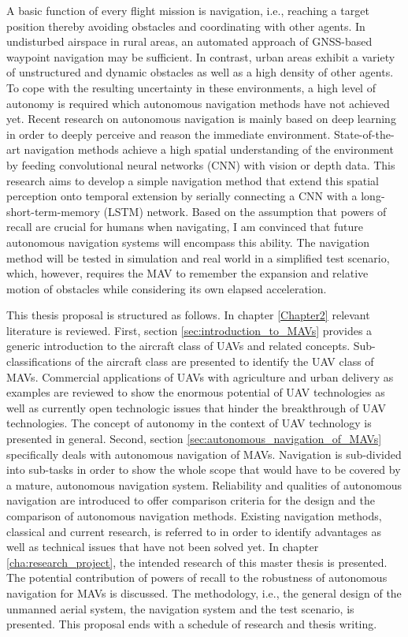A basic function of every flight mission is navigation, i.e.,
reaching a target position thereby avoiding obstacles and coordinating with other agents.
In undisturbed airspace in rural areas, an automated approach of GNSS-based waypoint navigation may be sufficient.
In contrast, urban areas exhibit a variety of unstructured and dynamic obstacles
as well as a high density of other agents. 
To cope with the resulting uncertainty in these environments,
a high level of autonomy is required which autonomous navigation methods have not achieved yet.
Recent research on autonomous navigation is mainly based on deep learning 
in order to deeply perceive and reason the immediate environment.
State-of-the-art navigation methods achieve a high spatial understanding of the environment
by feeding convolutional neural networks (CNN) with vision or depth data.
This research aims to develop a simple navigation method that extend this spatial perception onto temporal extension 
by serially connecting a CNN with a long-short-term-memory (LSTM) network.
Based on the assumption that powers of recall are crucial for humans when navigating,
I am convinced that future autonomous navigation systems will encompass this ability.
The navigation method will be tested in simulation and real world in a simplified test scenario,
which, however, requires the MAV to remember the expansion and relative motion of obstacles while considering its own elapsed acceleration.

This thesis proposal is structured as follows.
In chapter \ref{Chapter2} relevant literature is reviewed.
First, section \ref{sec:introduction_to_MAVs} provides a generic introduction to the aircraft class of UAVs and related concepts.
Sub-classifications of the aircraft class are presented to identify the UAV class of MAVs.
Commercial applications of UAVs with agriculture and urban delivery as examples  
are reviewed to show the enormous potential of UAV technologies
as well as currently open technologic issues that hinder the breakthrough of UAV technologies.
The concept of autonomy in the context of UAV technology is presented in general.
Second, section \ref{sec:autonomous_navigation_of_MAVs} specifically deals with autonomous navigation of MAVs.
Navigation is sub-divided into sub-tasks in order 
to show the whole scope that would have to be covered by a mature, autonomous navigation system.
Reliability and qualities of autonomous navigation are introduced to
offer comparison criteria for the design and the comparison of autonomous navigation methods.
Existing navigation methods, classical and current research, is referred to
in order to identify advantages as well as technical issues that have not been solved yet.
In chapter \ref{cha:research_project}, the intended research of this master thesis is presented.
The potential contribution of powers of recall to the robustness of autonomous navigation for MAVs is discussed.
The methodology, i.e., the general design of the unmanned aerial system, the navigation system and the test scenario,
is presented.
This proposal ends with a schedule of research and thesis writing. 









